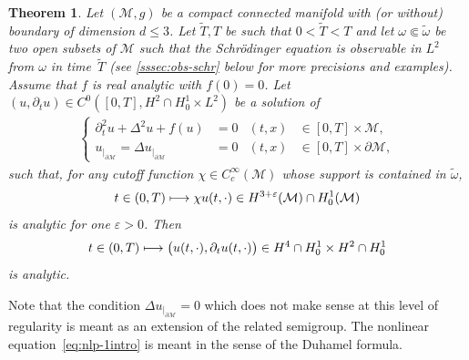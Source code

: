 \documentclass[10pt]{amsart}
\newcommand\mto{\mathchoice{\longmapsto}{\mapsto}{\mapsto}{\mapsto}}
\newtheorem{theorem}{Theorem}[section]
\theoremstyle{definition}
\let\mc\mathcal
\let\veps\varepsilon
\newcommand{\M}{\mc{M}}
\begin{document}
\begin{theorem}\label{thm:analytic-nlp}
Let $(\M, g)$ be a compact connected manifold with (or without) boundary of dimension $d\leq 3$. Let $\widetilde{T},T$ be such that $0<\widetilde{T}<T$ and let $\omega\Subset \widetilde{\omega}$ be two open subsets of $\M$ such that the Schrödinger equation is observable in $L^2$ from $\omega$ in time~$\widetilde{T}$ (see \cref{sssec:obs-schr} below for more precisions and examples). Assume that $f$ is real analytic with $f(0)=0$. Let $(u, \partial_t u)\in C^0([0, T], H^2\cap H_0^1\times L^2)$ be a solution of
\begin{align}\label{eq:nlp-1intro}
\left\{\begin{aligned}
\partial_t^2 u+\Delta^2 u+f(u)&=0 &(t, x)&\in [0, T]\times \M,\\
u_{|_{\partial\M}}=\Delta u_{|_{\partial\M}}&=0 &(t, x)&\in [0, T]\times\partial\M,
\end{aligned}\right.
\end{align}
such that, for any cutoff function $\chi\in C_c^\infty(\M)$ whose support is contained in $\widetilde{\omega}$,
\[
t\in (0, T)\mto \chi u(t,\cdot)\in H^{3+\veps}(\M)\cap H_0^1(\M)
\]
is analytic for one $\veps>0$. Then
\[
t\in (0, T)\mto \big(u(t, \cdot), \partial_t u(t,\cdot)\big)\in H^4\cap H_0^1\times H^2\cap H_0^1
\]
is analytic.
\end{theorem}

Note that the condition $\Delta u_{|_{\partial\M}}=0$ which does not make sense at this level of regularity is meant as an extension of the related semigroup. The nonlinear equation~\eqref{eq:nlp-1intro} is meant in the sense of the Duhamel formula.
\end{document}
